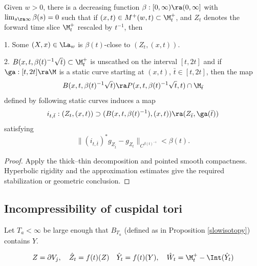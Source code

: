 \begin{lemma}
  \label{lem:kl-hyperbolic-rigidity-stabilization-thick-part-existence-cap-geometry}

\label{II.7.2again}
Given $w>0$, there is a decreasing function
$\beta:[0,\infty)\ra (0,\infty]$
with $\lim_{s\ra\infty}\beta(s)=0$ such that
if
$(x,t)\in M^+(w,t)\subset\M_t^+$,
and  $Z_t$ denotes
the forward time slice
$\M_t^+$ rescaled by $t^{-1}$, then

1.  Some $(X,x)\in \La_w$
is $\beta(t)$-close to $(Z_t,(x,t))$.

2.
$B(x,t,\beta(t)^{-1}\sqrt{t})\subset \M_t^+$
is unscathed
on the interval $[t,2t]$ and if $\ga:[t,2t]\ra \M$ is a static
curve starting at $(x,t)$, $\bar t\in [t,2t]$, then the map
\begin{equation}
B(x,t,\beta(t)^{-1}\sqrt{t})\ra
P(x,t,\beta(t)^{-1}\sqrt{t},t)\cap\M_{\bar t}
\end{equation}
defined by following static curves induces a map
\begin{equation}
i_{t,\bar t}:(Z_t,(x,t))\supset (B(x,t,\beta(t)^{-1}),(x,t))
\ra (Z_{\bar t},\ga(\bar t))
\end{equation}
satisfying
\begin{equation}
\|\left(i_{t,\bar t}\right)^*g_{Z_{\bar
t}}-g_{Z_t}\|_{C^{\beta(t)^{-1}}}
<\beta(t).
\end{equation}
\end{lemma}

\begin{proof}
\sketch Apply the thick--thin decomposition and pointed smooth compactness. Hyperbolic rigidity and the approximation estimates give the required stabilization or geometric conclusion.
\end{proof}

\subsection{Incompressibility of cuspidal tori} \label{inctori}

Let $T_a<\infty$ be large enough  that  $B_{T_a}$  (defined as in Proposition \ref{slowisotopy})
contains $Y$.

\begin{equation}
Z =  \partial V_{j},\quad\hat Z_t =  f(t)(Z)\\
\quad \hat Y_t =  f(t)(Y),\quad
\hat W_t =  \M_t^+ -  \Int(\hat Y_t)
\end{equation}

